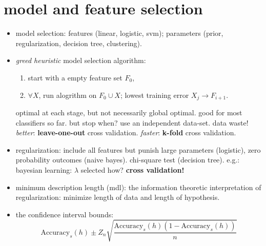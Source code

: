 \documentclass{article}
\begin{document}
\section{model and feature selection}
\begin{itemize}
	\item model selection: features (linear, logistic, svm); parameters
		(prior, regularization, decision tree, clustering). 
	\item {\it greed heuristic} model selection algorithm: 
		\begin{enumerate}
			\item start with a empty feature set $F_0$, 
			\item $\forall X$, run alogrithm on $F_0\cup X$; lowest training error
				$X_j\rightarrow F_{i+1}$.
		\end{enumerate}
		optimal at each stage, but not necessarily global optimal. good for
		most classifiers so far. but stop when? use an independent data-set. data waste!
		{\it better}: {\bf leave-one-out} cross validation.
		{\it faster}: {\bf k-fold} cross validation. 
	\item regularization: include all features but punish large parameters (logistic), 
		zero probability outcomes (naive bayes). chi-square test (decision tree). 
		e.g.: bayesian learning: $\lambda$ selected how? {\bf cross validation!}
	\item minimum description length (mdl): the information theoretic interpretation
		of regularization: minimize length of data and length of hypothesis. 
	\item the confidence interval bounds:
		\begin{equation}
			\text{Accuracy}_s(h)\pm Z_n\sqrt{\frac{\text{Accuracy}_s(h)(1-\text{Accuracy}_s(h))}{n}}
		\end{equation}
\end{itemize}
\end{document}
